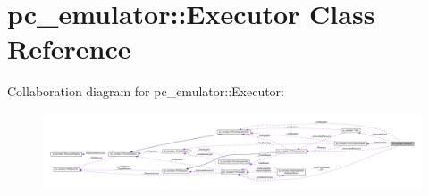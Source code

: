 \hypertarget{classpc__emulator_1_1Executor}{}\section{pc\+\_\+emulator\+:\+:Executor Class Reference}
\label{classpc__emulator_1_1Executor}


Collaboration diagram for pc\+\_\+emulator\+:\+:Executor\+:
\nopagebreak
\begin{figure}[H]
\begin{center}
\leavevmode
\includegraphics[width=350pt]{classpc__emulator_1_1Executor__coll__graph}
\end{center}
\end{figure}
